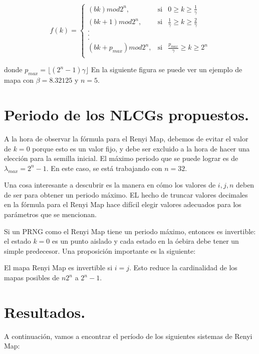 \documentclass{llncs}
\begin{document}
\[f(k)=
\left\{
\begin{array}{rcl}
(bk) mod 2^{n}, & \mbox{si} & 0 \geq k \geq  \frac{1}{\gamma}\\
(bk+1) mod 2^{n}, & \mbox{si} & \frac{1}{\gamma} \geq k \geq  \frac{2}{\gamma}\\
. \\
. \\
. \\
(bk+p_{max}) mod 2^{n}, & \mbox{si} & \frac{p_{max}}{\gamma} \geq k \geq 2^{n}\\
\end{array}
\right. \]

donde $p_{max}= \lfloor (2^{n}-1)\gamma \rfloor$ En la siguiente figura se puede ver un ejemplo de mapa con $\beta= 8.32125$ y $n=5$.



\section{Periodo de los NLCGs propuestos.}

A la hora de observar la fórmula para el Renyi Map, debemos de evitar el valor de $k=0$ porque esto es un valor fijo, y debe ser excluido a la hora de hacer una elección para la semilla inicial.
El máximo periodo que se puede lograr es de  $\lambda_{max}=2^{n}-1$. En este caso, se está trabajando con $n=32$. 

Una cosa interesante a descubrir es la manera en cómo los valores de $i, j, n$ deben de ser para obtener un periodo máximo. EL hecho de truncar valores decimales en la fórmula para el Renyi Map hace difícil elegir valores adecuados para los parámetros que se mencionan.

Si un PRNG como el Renyi Map tiene un periodo máximo, entonces es invertible: el estado $k=0$ es un punto aislado y cada estado en la óebira debe tener un simple predecesor. Una proposición importante es la siguiente:

El mapa Renyi Map es invertible si $i=j$. Esto reduce la cardinalidad de los mapas posibles de $n2^{n}$ a $2^{n}-1$.



\section{Resultados.}
A continuación, vamos a encontrar el período de los siguientes sistemas de Renyi Map:
\end{document}

